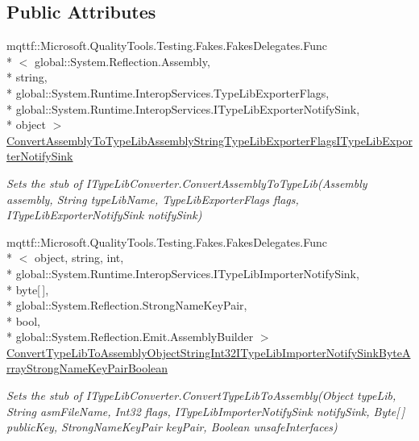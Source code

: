 \subsection*{Public Attributes}
\begin{DoxyCompactItemize}
\item 
mqttf\-::\-Microsoft.\-Quality\-Tools.\-Testing.\-Fakes.\-Fakes\-Delegates.\-Func\\*
$<$ global\-::\-System.\-Reflection.\-Assembly, \\*
string, \\*
global\-::\-System.\-Runtime.\-Interop\-Services.\-Type\-Lib\-Exporter\-Flags, \\*
global\-::\-System.\-Runtime.\-Interop\-Services.\-I\-Type\-Lib\-Exporter\-Notify\-Sink, \\*
object $>$ \hyperlink{class_system_1_1_runtime_1_1_interop_services_1_1_fakes_1_1_stub_i_type_lib_converter_a10eeb1524179a2c7242e942efb9752c2}{Convert\-Assembly\-To\-Type\-Lib\-Assembly\-String\-Type\-Lib\-Exporter\-Flags\-I\-Type\-Lib\-Exporter\-Notify\-Sink}
\begin{DoxyCompactList}\small\item\em Sets the stub of I\-Type\-Lib\-Converter.\-Convert\-Assembly\-To\-Type\-Lib(\-Assembly assembly, String type\-Lib\-Name, Type\-Lib\-Exporter\-Flags flags, I\-Type\-Lib\-Exporter\-Notify\-Sink notify\-Sink)\end{DoxyCompactList}\item 
mqttf\-::\-Microsoft.\-Quality\-Tools.\-Testing.\-Fakes.\-Fakes\-Delegates.\-Func\\*
$<$ object, string, int, \\*
global\-::\-System.\-Runtime.\-Interop\-Services.\-I\-Type\-Lib\-Importer\-Notify\-Sink, \\*
byte\mbox{[}$\,$\mbox{]}, \\*
global\-::\-System.\-Reflection.\-Strong\-Name\-Key\-Pair, \\*
bool, \\*
global\-::\-System.\-Reflection.\-Emit.\-Assembly\-Builder $>$ \hyperlink{class_system_1_1_runtime_1_1_interop_services_1_1_fakes_1_1_stub_i_type_lib_converter_a2ccea0484704803e6603bb2b45f4d7fb}{Convert\-Type\-Lib\-To\-Assembly\-Object\-String\-Int32\-I\-Type\-Lib\-Importer\-Notify\-Sink\-Byte\-Array\-Strong\-Name\-Key\-Pair\-Boolean}
\begin{DoxyCompactList}\small\item\em Sets the stub of I\-Type\-Lib\-Converter.\-Convert\-Type\-Lib\-To\-Assembly(\-Object type\-Lib, String asm\-File\-Name, Int32 flags, I\-Type\-Lib\-Importer\-Notify\-Sink notify\-Sink, Byte\mbox{[}$\,$\mbox{]} public\-Key, Strong\-Name\-Key\-Pair key\-Pair, Boolean unsafe\-Interfaces)\end{DoxyCompactList}\item 

\end{DoxyCompactItemize}
